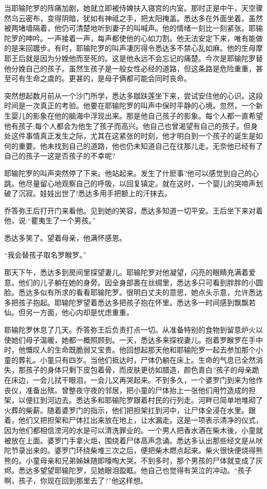 \documentclass[12pt,twoside,openany]{book}
\begin{document}
当耶输陀罗的阵痛加剧，她就立即被侍婢扶入寝宫的内室。那时正是中午，天空骤然乌云密布，变得阴暗，犹如有神祗之手，把太阳掩盖。悉达多在外面坐着。虽然被两堵墙隔着，他仍可清楚地听到妻子的叫喊声。他的情绪一刻比一刻紧张。耶输陀罗的呻吟。一声接着一声，每声都使他的心如刀割。他无法安定下来，唯有能做的是来回踱步。有时，耶输陀罗的叫声凄厉得令悉达多不禁心乱如麻。他的生母摩耶王后就是因为分娩他而至死的。这是他永远不会忘记的痛楚。今次是耶输陀罗替他分娩自己的孩子。虽然生孩子是一般女性必经的道路，但这条路是危险重重，甚至可有生命之虞的。更甚的，是母子俩都可能会同时丧命。

突然想起数月前从一个沙门所学，悉达多跏趺莲坐下来，尝试安住他的心识。这段时间是一次真正的考验。他要在耶输陀罗的叫声中保时平静的心境。忽然，一个新生婴儿的影象在他的脑海中浮现出来。那是他自己孩子的影象。每个人都一直希望他有孩子;每个人都会为他生了孩子而高兴。他自己也曾渴望有自己的孩子。但身处这件事情真正发生之际，尤其在这紧张的时刻，他才明白到一个孩子的诞生是如何的重要。他未找到自己的道路，他也仍未知道自己在往那儿走。无奈他已经有了自己的孩子一这是否孩子的不幸呢?

耶输陀罗的叫声突然停了下来。他站起来。发生了什麽事?他可以感觉到自己的心跳。他尽量留心地观察自己的呼吸，以回复镇定。就在这时，一个婴儿的哭啼声划破了沉寂。娃娃出世了!悉达多用手把额上的汗抹去。

乔答弥王后打开门来看他。见到她的笑容，悉达多知道一切平安。王后坐下来对着他，说:“瞿夷生了一个男孩。”

悉达多笑了。望着母亲，他满怀感恩。

“我会替孩子取名罗睺罗。”

那天下午，悉达多到房间里探望妻儿。耶输陀罗对他凝望，闪亮的眼睛充满着爱意。他们的儿子躺在她的身旁。因全身部裹在丝绸里，悉达多只可看到胖胖的小圆脸。悉达多似有所求的看看耶输陀罗。很明白丈夫的意思，她点头示意，允许悉达多把孩子抱起。耶输陀罗望着悉达多把孩子抱在怀里。悉达多一时间感到飘飘若仙。但另一方面，他心内却是忧虑重重。

耶输陀罗休息了几天。乔答弥王后负责打点一切。从准备特别的食物到留意炉火以使她们母子温暖，她都一概照顾到。一天，悉达多来探视妻儿。抱着罗睺罗在手中时，他慨叹人的生命既脆弱又宝贵。他回想起那天他和耶输陀罗一起去参加那个小童的葬礼。小童只有四岁。当他们抵达时，尸体仍躺在床上。生命的气息已全然消失，那孩子的身体只剩下皮包着骨，而皮肤更彷如腊造，颜色青白?孩子的母亲跪在床边，一会儿拭干眼泪，一会儿又再哭起来。不到多久，一个婆罗门到来为他作丧仪，准备出殡。曾整夜守夜的邻居，把小童的尸体抬上一张他们用竹造成的担架，以便扛到河边去。悉达多和耶输陀罗跟着村民的行列走。河畔已简单地堆砌了火葬的柴薪。随着婆罗门的指示，他们把担架扛到河中，让尸体全浸在水里。跟着，他们又把担架和尸体扛出来放在地上，让水漏走。这是一项表示清净的仪式，因为他们都相信滂河的水是可以清洗罪业的。一个男人把香水酒在柴木後，小童就被放在上面。婆罗门手拿火炬，围绕着尸体高声念诵。悉达多认出那些经文是从吠陀节录出来的。婆罗门环绕柴堆三次之后，便把柴木燃点起来。柴火很快便烧得熊熊的。小童母亲和兄弟姊妹随即嚎啕大哭。不到多时，那个男孩的尸体就变成了灰烬。悉达多望望耶输陀罗，见她眼泪盈眶。他自己也觉得有哭泣的冲动。“孩子啊，孩子，你现在回到那里去了?”他这样想。
\end{document}
